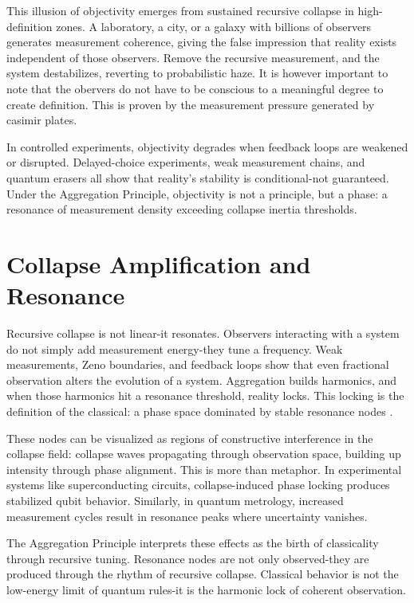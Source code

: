 This illusion of objectivity emerges from sustained recursive collapse in high-definition zones. 
A laboratory, a city, or a galaxy with billions of observers generates measurement coherence, giving the false impression that reality exists independent of those observers. 
Remove the recursive measurement, and the system destabilizes, reverting to probabilistic haze.
It is however important to note that the obervers do not have to be conscious to a meaningful degree to create definition. This is proven by the measurement pressure generated by casimir plates.

In controlled experiments, objectivity degrades when feedback loops are weakened or disrupted. 
Delayed-choice experiments, weak measurement chains, and quantum erasers all show that reality's stability is conditional-not guaranteed. 
Under the Aggregation Principle, objectivity is not a principle, but a phase: a resonance of measurement density exceeding collapse inertia thresholds.

\section{Collapse Amplification and Resonance}

Recursive collapse is not linear-it resonates. Observers interacting with a system do not simply add measurement energy-they tune a frequency. Weak measurements, Zeno boundaries, and feedback loops show that even fractional observation alters the evolution of a system. Aggregation builds harmonics, and when those harmonics hit a resonance threshold, reality locks. This locking is the definition of the classical: a phase space dominated by stable resonance nodes \cite{aggregation_decoherence_core}.

These nodes can be visualized as regions of constructive interference in the collapse field: collapse waves propagating through observation space, building up intensity through phase alignment. This is more than metaphor. In experimental systems like superconducting circuits, collapse-induced phase locking produces stabilized qubit behavior. Similarly, in quantum metrology, increased measurement cycles result in resonance peaks where uncertainty vanishes.

The Aggregation Principle interprets these effects as the birth of classicality through recursive tuning. Resonance nodes are not only observed-they are produced through the rhythm of recursive collapse. Classical behavior is not the low-energy limit of quantum rules-it is the harmonic lock of coherent observation.

